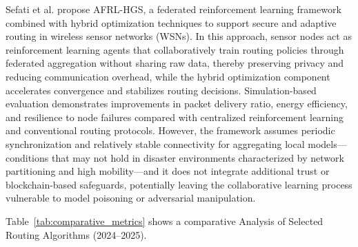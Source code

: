Sefati et al. \cite{sefati_federated_2025} propose AFRL-HGS, a federated reinforcement learning framework combined with hybrid optimization techniques to support secure and adaptive routing in wireless sensor networks (WSNs). In this approach, sensor nodes act as reinforcement learning agents that collaboratively train routing policies through federated aggregation without sharing raw data, thereby preserving privacy and reducing communication overhead, while the hybrid optimization component accelerates convergence and stabilizes routing decisions. Simulation-based evaluation demonstrates improvements in packet delivery ratio, energy efficiency, and resilience to node failures compared with centralized reinforcement learning and conventional routing protocols. However, the framework assumes periodic synchronization and relatively stable connectivity for aggregating local models—conditions that may not hold in disaster environments characterized by network partitioning and high mobility—and it does not integrate additional trust or blockchain-based safeguards, potentially leaving the collaborative learning process vulnerable to model poisoning or adversarial manipulation.

Table~\ref{tab:comparative_metrics} shows a comparative Analysis of Selected Routing Algorithms (2024–2025).

\begin{table}[!t]
\caption{Comparative Analysis of Selected Routing Algorithms (2024–2025)}
\renewcommand{\arraystretch}{1.0}
\label{tab:comparative_metrics}
\end{table}


